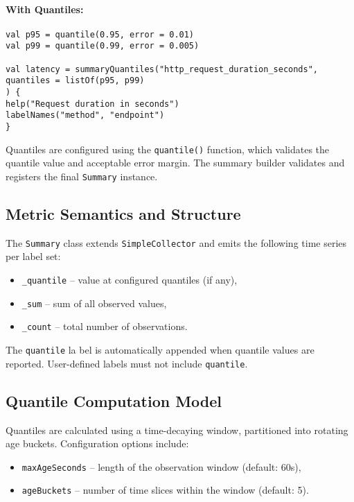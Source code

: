 \paragraph{With Quantiles:}
\begin{verbatim}
val p95 = quantile(0.95, error = 0.01)
val p99 = quantile(0.99, error = 0.005)

val latency = summaryQuantiles("http_request_duration_seconds",
quantiles = listOf(p95, p99)
) {
help("Request duration in seconds")
labelNames("method", "endpoint")
}
\end{verbatim}

Quantiles are configured using the \texttt{quantile()} function, which validates the quantile value and acceptable error margin. The summary builder validates and registers the final \texttt{Summary} instance.

\subsection{Metric Semantics and Structure}

The \texttt{Summary} class extends \texttt{SimpleCollector} and emits the following time series per label set:
\begin{itemize}
\item \texttt{\_quantile} – value at configured quantiles (if any),
\item \texttt{\_sum} – sum of all observed values,
\item \texttt{\_count} – total number of observations.
\end{itemize}

The \texttt{quantile} la bel is automatically appended when quantile values are reported. User-defined labels must not include \texttt{quantile}.

\subsection{Quantile Computation Model}

Quantiles are calculated using a time-decaying window, partitioned into rotating age buckets. Configuration options include:
\begin{itemize}
\item \texttt{maxAgeSeconds} – length of the observation window (default: 60s),
\item \texttt{ageBuckets} – number of time slices within the window (default: 5).
\end{itemize}

